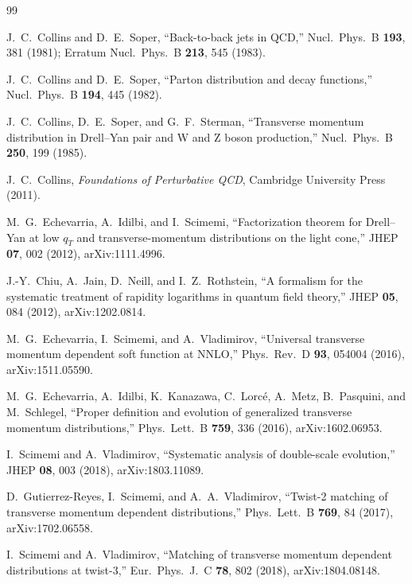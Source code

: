 \documentclass[11pt]{article}
\begin{document}
\small
\begin{thebibliography}{99}

J.~C.~Collins and D.~E.~Soper,
``Back-to-back jets in QCD,''
Nucl.\ Phys.\ B \textbf{193}, 381 (1981);
Erratum Nucl.\ Phys.\ B \textbf{213}, 545 (1983).

J.~C.~Collins and D.~E.~Soper,
``Parton distribution and decay functions,''
Nucl.\ Phys.\ B \textbf{194}, 445 (1982).

J.~C.~Collins, D.~E.~Soper, and G.~F.~Sterman,
``Transverse momentum distribution in Drell--Yan pair and W and Z boson production,''
Nucl.\ Phys.\ B \textbf{250}, 199 (1985).

J.~C.~Collins,
\emph{Foundations of Perturbative QCD},
Cambridge University Press (2011).

M.~G.~Echevarria, A.~Idilbi, and I.~Scimemi,
``Factorization theorem for Drell--Yan at low \(q_T\) and transverse-momentum distributions on the light cone,''
JHEP \textbf{07}, 002 (2012), arXiv:1111.4996.

J.-Y.~Chiu, A.~Jain, D.~Neill, and I.~Z.~Rothstein,
``A formalism for the systematic treatment of rapidity logarithms in quantum field theory,''
JHEP \textbf{05}, 084 (2012), arXiv:1202.0814.

M.~G.~Echevarria, I.~Scimemi, and A.~Vladimirov,
``Universal transverse momentum dependent soft function at NNLO,''
Phys.\ Rev.\ D \textbf{93}, 054004 (2016), arXiv:1511.05590.

M.~G.~Echevarria, A.~Idilbi, K.~Kanazawa, C.~Lorc\'e, A.~Metz,
B.~Pasquini, and M.~Schlegel,
``Proper definition and evolution of generalized transverse momentum distributions,''
Phys.\ Lett.\ B \textbf{759}, 336 (2016), arXiv:1602.06953.

I.~Scimemi and A.~Vladimirov,
``Systematic analysis of double-scale evolution,''
JHEP \textbf{08}, 003 (2018), arXiv:1803.11089.

D.~Gutierrez-Reyes, I.~Scimemi, and A.~A.~Vladimirov,
``Twist-2 matching of transverse momentum dependent distributions,''
Phys.\ Lett.\ B \textbf{769}, 84 (2017), arXiv:1702.06558.

I.~Scimemi and A.~Vladimirov,
``Matching of transverse momentum dependent distributions at twist-3,''
Eur.\ Phys.\ J.\ C \textbf{78}, 802 (2018), arXiv:1804.08148.


\end{thebibliography}
\end{document}
